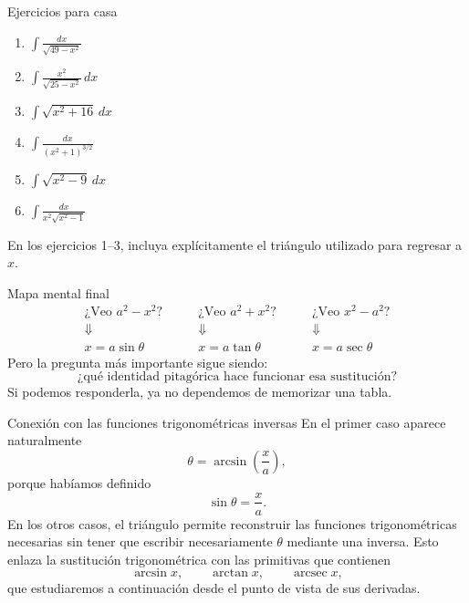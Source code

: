 \documentclass[10pt,aspectratio=169]{beamer}
\begin{document}
\begin{frame}{Ejercicios para casa}
\begin{enumerate}
\item $\displaystyle \int\frac{dx}{\sqrt{49-x^2}}$
\item $\displaystyle \int\frac{x^2}{\sqrt{25-x^2}}\,dx$
\item $\displaystyle \int\sqrt{x^2+16}\,dx$
\item $\displaystyle \int\frac{dx}{(x^2+1)^{3/2}}$
\item $\displaystyle \int\sqrt{x^2-9}\,dx$
\item $\displaystyle \int\frac{dx}{x^2\sqrt{x^2-1}}$
\end{enumerate}
En los ejercicios 1--3, incluya explícitamente el triángulo utilizado para regresar a $x$.
\end{frame}

\begin{frame}{Mapa mental final}
\[
\boxed{
\begin{array}{c}
\text{¿Veo }a^2-x^2?\\
\Downarrow\\
x=a\sin\theta
\end{array}}
\qquad
\boxed{
\begin{array}{c}
\text{¿Veo }a^2+x^2?\\
\Downarrow\\
x=a\tan\theta
\end{array}}
\qquad
\boxed{
\begin{array}{c}
\text{¿Veo }x^2-a^2?\\
\Downarrow\\
x=a\sec\theta
\end{array}}
\]
\vspace{4mm}
Pero la pregunta más importante sigue siendo:
\[
\boxed{\text{¿qué identidad pitagórica hace funcionar esa sustitución?}}
\]
Si podemos responderla, ya no dependemos de memorizar una tabla.
\end{frame}

\begin{frame}{Conexión con las funciones trigonométricas inversas}
En el primer caso aparece naturalmente
\[
\theta=\arcsin\left(\frac{x}{a}\right),
\]
porque habíamos definido
\[
\sin\theta=\frac{x}{a}.
\]
En los otros casos, el triángulo permite reconstruir las funciones trigonométricas necesarias sin tener que escribir necesariamente $\theta$ mediante una inversa.
\vspace{2mm}
Esto enlaza la sustitución trigonométrica con las primitivas que contienen
\[
\arcsin x,\qquad \arctan x,\qquad \operatorname{arcsec}x,
\]
que estudiaremos a continuación desde el punto de vista de sus derivadas.
\end{frame}
\end{document}
